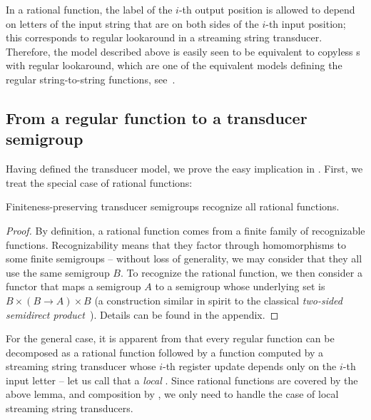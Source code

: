 In a rational function, the label of the $i$-th output position is allowed to depend on letters of the input string that are on both sides of the $i$-th input position; this corresponds to regular lookaround in a streaming string transducer. Therefore, the model described above is easily seen to be equivalent to copyless \sst{}s with regular lookaround, which are one of the equivalent models defining the regular string-to-string functions, see~\cite[Section~IV.C]{AlurFT12}.

\subsection{From a regular function to a transducer semigroup}
\label{sec:easy}

Having defined the transducer model, we prove the easy implication in
. First, we treat the special case of rational
functions:
\begin{lemma}\label{lem:rational-to-functor}
  Finiteness-preserving transducer semigroups recognize all rational functions.
\end{lemma}
\begin{proof}
  By definition, a rational function comes from a finite family of recognizable
  functions. Recognizability means that they factor through homomorphisms to
  some finite semigroups -- without loss of generality, we may consider that
  they all use the same semigroup $B$. To recognize the rational function, we
  then consider a functor that maps a semigroup $A$ to a semigroup whose
  underlying set is $B \times (B \to A) \times B$ (a construction similar in
  spirit to the classical \emph{two-sided semidirect
    product}~\cite[\S6]{rhodes1989kernel}). Details can be found in the
  appendix.
\end{proof}

For the general case, it is apparent from  that every
regular function can be decomposed as a rational function followed by a function
computed by a streaming string transducer whose $i$-th register update depends
only on the $i$-th input letter -- let us call that a \emph{local} \sst. Since
rational functions are covered by the above lemma, and composition by
, we only need to handle the case of local streaming
string transducers.

